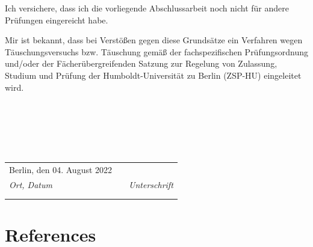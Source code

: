 \documentclass[12pt,twoside]{reedthesis}
\begin{document}
Ich versichere, dass ich die vorliegende Abschlussarbeit noch nicht für andere Prüfungen eingereicht habe.

Mir ist bekannt, dass bei Verstößen gegen diese Grundsätze ein Verfahren wegen Täuschungsversuchs bzw. Täuschung gemäß der fachspezifischen Prüfungsordnung und/oder der Fächerübergreifenden Satzung zur Regelung von Zulassung, Studium und Prüfung der Humboldt-Universität zu Berlin (ZSP-HU) eingeleitet wird.

\hfill\break
~

\hfill\break
~

\hfill\break
~
\begin{tabular}{m{6cm}m{2cm}m{6cm}}
Berlin, den 04. August 2022 &  &              \\ \cline{1-1} \cline{3-3} 
\textit{Ort, Datum}            &  & \textit{Unterschrift} \\
                       &  &              \\
                       &  &             
\end{tabular}
\backmatter

\hypertarget{references}{%
\chapter*{References}\label{references}}


\noindent

\setlength{\parindent}{-0.20in}
\end{document}
